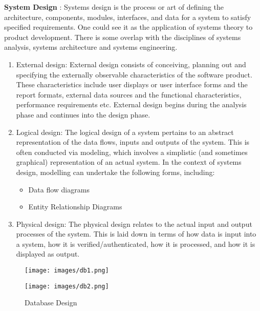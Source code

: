 {\bf System Design} : Systems design is the process or art of defining 
the architecture, components, modules, interfaces, and data for a 
system to satisfy specified requirements. One could see it as the 
application of systems theory to product development. There is some 
overlap with the disciplines of systems analysis, systems architecture 
and systems engineering.
\begin{enumerate}
\item  External design: External design consists of conceiving, 
planning out and specifying the externally observable characteristics 
of the software product. These characteristics include user displays or 
user interface forms and the report formats, external data sources and 
the functional characteristics, performance requirements etc. External 
design begins during the analysis phase
and continues into the design phase.
\item  Logical design: The logical design of a system pertains to an 
abstract representation of the data flows, inputs and outputs of the 
system. This is often conducted via modeling, which involves a 
simplistic (and sometimes graphical) representation of an actual system. 
In the context of systems design, modelling can undertake the following 
forms, including:
\begin{itemize}
\item Data flow diagrams
\item Entity Relationship Diagrams
\end{itemize}
\item  Physical design: The physical design relates to the actual input 
and output processes of the system. This is laid down in terms of how 
data is input into a system, how it is verified/authenticated, how it 
is processed, and how it is displayed as output.
\end{enumerate}


\newpage
\begin{figure}[h]
\centering \texttt{[image: images/db1.png]}

\end{figure}
\newpage
\begin{figure}[h]
\centering \texttt{[image: images/db2.png]}
\caption{Database Design}
\end{figure}
